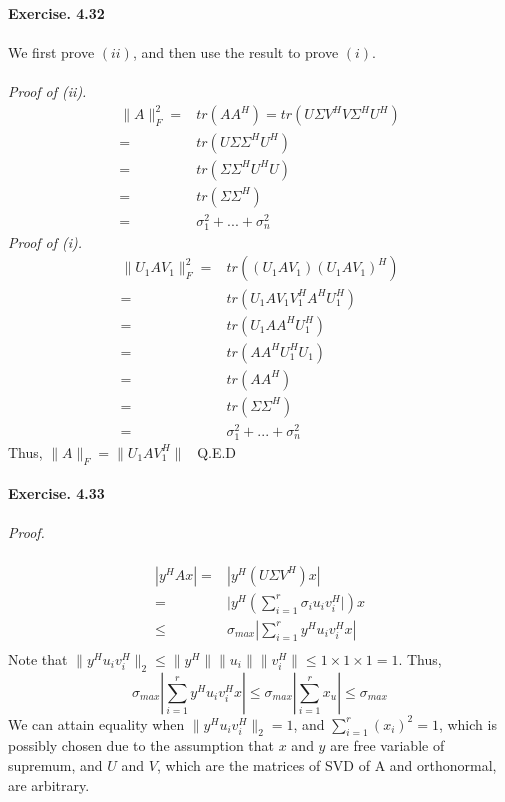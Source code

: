 \documentclass[letterpaper,12pt]{article}
\theoremstyle{definition}
\begin{document}
\textbf{Exercise. 4.32}\\\\

We first prove $(ii)$, and then use the result to prove $(i)$. \\\\
\emph{Proof of (ii).}
\begin{align*}
   \|A\|_{F}^{2} =& tr(A A^H) = tr(U \Sigma V^H V \Sigma^H U^H) \\
                 =& tr(U \Sigma \Sigma^H U^H) \\
                 =& tr(\Sigma \Sigma^H U^H U) \\
                 =& tr(\Sigma \Sigma^H) \\
                 =& \sigma_{1}^2 + ... + \sigma_{n}^2
\end{align*}
\emph{Proof of (i).}
\begin{align*}
   \|U_1 A V_1\|_{F}^{2} =& tr((U_1 A V_1) (U_1 A V_1)^H) \\
                         =& tr(U_1 A V_1 V_{1}^H A^H U_{1}^H) \\
                         =& tr(U_1 A A^H U_{1}^H) \\
                         =& tr(A A^H U_{1}^H U_{1}) \\
                         =& tr(AA^H) \\
                         =& tr(\Sigma \Sigma^H) \\
                         =& \sigma_{1}^2 + ... + \sigma_{n}^2
	\end{align*}
Thus, $\|A\|_F = \|U_1 A V_{1}^H\|$ \ Q.E.D \\\\



\textbf{Exercise. 4.33}\\\\

\emph{Proof.} \\\\
\begin{align*}
 |y^H A x|  =& |y^H (U \Sigma V^H) x| \\
            =& |y^H (\sum_{i=1}^{r} \sigma_i u_i v_{i}^H |)x \\
         \leq& \sigma_{max} | \sum_{i=1}^{r} y^H u_i v_{i}^H x |\\
\end{align*}
Note that $\| y^H u_i v_{i}^H \|_2 \leq \| y^H \| \|u_i\| \|v_{i}^H\| \leq 1 \times 1 \times 1 = 1 $. Thus,
\[\sigma_{max} | \sum_{i=1}^{r} y^H u_i v_{i}^H x | \leq \sigma_{max} | \sum_{i=1}^{r} x_u | \leq \sigma_{max} \]
We can attain equality when $\| y^H u_i v_{i}^H \|_2 = 1$, and $\sum_{i=1}^{r} (x_i)^2 = 1$, which is possibly chosen due to the assumption that $x$ and $y$ are free variable of supremum, and $U$ and $V$, which are the matrices of SVD of A and orthonormal, are arbitrary.\newline
\end{document}
